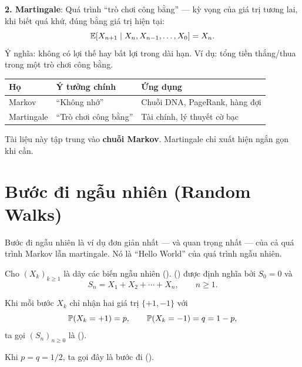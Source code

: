 \textbf{2. Martingale}: Quá trình ``trò chơi công bằng'' --- kỳ vọng của giá trị tương lai,
khi biết quá khứ, đúng bằng giá trị hiện tại:
\[
  \mathbb{E}[X_{n+1} \mid X_n, X_{n-1}, \ldots, X_0] = X_n.
\]
Ý nghĩa: không có lợi thế hay bất lợi trong dài hạn. Ví dụ: tổng tiền thắng/thua trong một trò chơi công bằng.

\begin{tomtat}
\begin{center}
\begin{tabular}{lll}
\textbf{Họ} & \textbf{Ý tưởng chính} & \textbf{Ứng dụng} \\
\hline
Markov & ``Không nhớ'' & Chuỗi DNA, PageRank, hàng đợi \\
Martingale & ``Trò chơi công bằng'' & Tài chính, lý thuyết cờ bạc \\
\end{tabular}
\end{center}
Tài liệu này tập trung vào \textbf{chuỗi Markov}. Martingale chỉ xuất hiện ngắn gọn khi cần.
\end{tomtat}

\section{Bước đi ngẫu nhiên (Random Walks)}
\label{sec:random-walks}

Bước đi ngẫu nhiên là ví dụ đơn giản nhất --- và quan trọng nhất --- của cả quá trình Markov lẫn martingale.
Nó là ``Hello World'' của quá trình ngẫu nhiên.

\begin{dinhnghia}
\label{def:random-walk}
Cho $(X_k)_{k \geq 1}$ là dãy các biến ngẫu nhiên  ().
 () được định nghĩa bởi $S_0 = 0$ và
\begin{equation}\label{eq:rw-def}
  S_n = X_1 + X_2 + \cdots + X_n, \qquad n \geq 1.
\end{equation}
\end{dinhnghia}

\begin{dinhnghia}
\label{def:bernoulli-walk}
Khi mỗi bước $X_k$ chỉ nhận hai giá trị $\{+1, -1\}$ với
\[
  \mathbb{P}(X_k = +1) = p, \qquad \mathbb{P}(X_k = -1) = q = 1 - p,
\]
ta gọi $(S_n)_{n \geq 0}$ là  ().

Khi $p = q = 1/2$, ta gọi đây là bước đi  ().
\end{dinhnghia}

